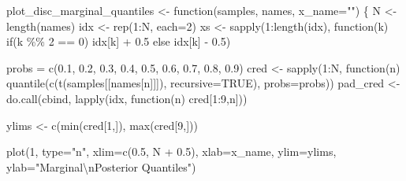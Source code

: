 \documentclass[
  letterpaper,
  DIV=11,
  numbers=noendperiod]{scrartcl}
\newenvironment{Shaded}{\begin{snugshade}}{\end{snugshade}}
\newcommand{\AttributeTok}[1]{\textcolor[rgb]{0.40,0.45,0.13}{#1}}
\newcommand{\ConstantTok}[1]{\textcolor[rgb]{0.56,0.35,0.01}{#1}}
\newcommand{\ControlFlowTok}[1]{\textcolor[rgb]{0.00,0.23,0.31}{#1}}
\newcommand{\DecValTok}[1]{\textcolor[rgb]{0.68,0.00,0.00}{#1}}
\newcommand{\FloatTok}[1]{\textcolor[rgb]{0.68,0.00,0.00}{#1}}
\newcommand{\FunctionTok}[1]{\textcolor[rgb]{0.28,0.35,0.67}{#1}}
\newcommand{\NormalTok}[1]{\textcolor[rgb]{0.00,0.23,0.31}{#1}}
\newcommand{\OtherTok}[1]{\textcolor[rgb]{0.00,0.23,0.31}{#1}}
\newcommand{\SpecialCharTok}[1]{\textcolor[rgb]{0.37,0.37,0.37}{#1}}
\newcommand{\StringTok}[1]{\textcolor[rgb]{0.13,0.47,0.30}{#1}}
\begin{document}
\begin{Shaded}
\begin{Highlighting}[]
\NormalTok{plot\_disc\_marginal\_quantiles }\OtherTok{\textless{}{-}} \ControlFlowTok{function}\NormalTok{(samples, names, }\AttributeTok{x\_name=}\StringTok{""}\NormalTok{) \{}
\NormalTok{  N }\OtherTok{\textless{}{-}} \FunctionTok{length}\NormalTok{(names)}
\NormalTok{  idx }\OtherTok{\textless{}{-}} \FunctionTok{rep}\NormalTok{(}\DecValTok{1}\SpecialCharTok{:}\NormalTok{N, }\AttributeTok{each=}\DecValTok{2}\NormalTok{)}
\NormalTok{  xs }\OtherTok{\textless{}{-}} \FunctionTok{sapply}\NormalTok{(}\DecValTok{1}\SpecialCharTok{:}\FunctionTok{length}\NormalTok{(idx), }\ControlFlowTok{function}\NormalTok{(k)}
                              \ControlFlowTok{if}\NormalTok{(k }\SpecialCharTok{\%\%} \DecValTok{2} \SpecialCharTok{==} \DecValTok{0}\NormalTok{) idx[k] }\SpecialCharTok{+} \FloatTok{0.5} \ControlFlowTok{else}\NormalTok{ idx[k] }\SpecialCharTok{{-}} \FloatTok{0.5}\NormalTok{)}

\NormalTok{  probs }\OtherTok{=} \FunctionTok{c}\NormalTok{(}\FloatTok{0.1}\NormalTok{, }\FloatTok{0.2}\NormalTok{, }\FloatTok{0.3}\NormalTok{, }\FloatTok{0.4}\NormalTok{, }\FloatTok{0.5}\NormalTok{, }\FloatTok{0.6}\NormalTok{, }\FloatTok{0.7}\NormalTok{, }\FloatTok{0.8}\NormalTok{, }\FloatTok{0.9}\NormalTok{)}
\NormalTok{  cred }\OtherTok{\textless{}{-}} \FunctionTok{sapply}\NormalTok{(}\DecValTok{1}\SpecialCharTok{:}\NormalTok{N, }\ControlFlowTok{function}\NormalTok{(n)}
                      \FunctionTok{quantile}\NormalTok{(}\FunctionTok{c}\NormalTok{(}\FunctionTok{t}\NormalTok{(samples[[names[n]]]), }\AttributeTok{recursive=}\ConstantTok{TRUE}\NormalTok{),}
                               \AttributeTok{probs=}\NormalTok{probs))}
\NormalTok{  pad\_cred }\OtherTok{\textless{}{-}} \FunctionTok{do.call}\NormalTok{(cbind, }\FunctionTok{lapply}\NormalTok{(idx, }\ControlFlowTok{function}\NormalTok{(n) cred[}\DecValTok{1}\SpecialCharTok{:}\DecValTok{9}\NormalTok{,n]))}

\NormalTok{  ylims }\OtherTok{\textless{}{-}} \FunctionTok{c}\NormalTok{(}\FunctionTok{min}\NormalTok{(cred[}\DecValTok{1}\NormalTok{,]), }\FunctionTok{max}\NormalTok{(cred[}\DecValTok{9}\NormalTok{,]))}

  \FunctionTok{plot}\NormalTok{(}\DecValTok{1}\NormalTok{, }\AttributeTok{type=}\StringTok{"n"}\NormalTok{,}
       \AttributeTok{xlim=}\FunctionTok{c}\NormalTok{(}\FloatTok{0.5}\NormalTok{, N }\SpecialCharTok{+} \FloatTok{0.5}\NormalTok{), }\AttributeTok{xlab=}\NormalTok{x\_name,}
       \AttributeTok{ylim=}\NormalTok{ylims, }\AttributeTok{ylab=}\StringTok{"Marginal}\SpecialCharTok{\textbackslash{}n}\StringTok{Posterior Quantiles"}\NormalTok{)}


\end{Highlighting}
\end{Shaded}
\end{document}
